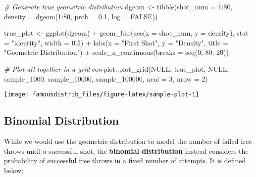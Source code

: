 \documentclass[
]{article}
\newenvironment{Shaded}{\begin{snugshade}}{\end{snugshade}}
\newcommand{\AttributeTok}[1]{\textcolor[rgb]{0.77,0.63,0.00}{#1}}
\newcommand{\CommentTok}[1]{\textcolor[rgb]{0.56,0.35,0.01}{\textit{#1}}}
\newcommand{\ConstantTok}[1]{\textcolor[rgb]{0.00,0.00,0.00}{#1}}
\newcommand{\DecValTok}[1]{\textcolor[rgb]{0.00,0.00,0.81}{#1}}
\newcommand{\FloatTok}[1]{\textcolor[rgb]{0.00,0.00,0.81}{#1}}
\newcommand{\FunctionTok}[1]{\textcolor[rgb]{0.00,0.00,0.00}{#1}}
\newcommand{\NormalTok}[1]{#1}
\newcommand{\OtherTok}[1]{\textcolor[rgb]{0.56,0.35,0.01}{#1}}
\newcommand{\SpecialCharTok}[1]{\textcolor[rgb]{0.00,0.00,0.00}{#1}}
\newcommand{\StringTok}[1]{\textcolor[rgb]{0.31,0.60,0.02}{#1}}
\begin{document}
\begin{Shaded}
\begin{Highlighting}[]
\CommentTok{\# Generate true geometric distribution }
\NormalTok{dgeom }\OtherTok{\textless{}{-}} \FunctionTok{tibble}\NormalTok{(}\AttributeTok{shot\_num =} \DecValTok{1}\SpecialCharTok{:}\DecValTok{80}\NormalTok{,}
                \AttributeTok{density =} \FunctionTok{dgeom}\NormalTok{(}\DecValTok{1}\SpecialCharTok{:}\DecValTok{80}\NormalTok{, }\AttributeTok{prob =} \FloatTok{0.1}\NormalTok{, }\AttributeTok{log =} \ConstantTok{FALSE}\NormalTok{))}

\NormalTok{true\_plot }\OtherTok{\textless{}{-}} \FunctionTok{ggplot}\NormalTok{(dgeom) }\SpecialCharTok{+}
  \FunctionTok{geom\_bar}\NormalTok{(}\FunctionTok{aes}\NormalTok{(}\AttributeTok{x =}\NormalTok{ shot\_num, }\AttributeTok{y =}\NormalTok{ density), }\AttributeTok{stat =} \StringTok{"identity"}\NormalTok{, }\AttributeTok{width =} \FloatTok{0.5}\NormalTok{) }\SpecialCharTok{+}
  \FunctionTok{labs}\NormalTok{(}\AttributeTok{x =} \StringTok{"First Shot"}\NormalTok{, }
       \AttributeTok{y =} \StringTok{"Density"}\NormalTok{, }
       \AttributeTok{title =} \StringTok{"Geometric Distribution"}\NormalTok{) }\SpecialCharTok{+}
  \FunctionTok{scale\_x\_continuous}\NormalTok{(}\AttributeTok{breaks =} \FunctionTok{seq}\NormalTok{(}\DecValTok{0}\NormalTok{, }\DecValTok{80}\NormalTok{, }\DecValTok{20}\NormalTok{))}

\CommentTok{\# Plot all together in a grid}
\NormalTok{cowplot}\SpecialCharTok{::}\FunctionTok{plot\_grid}\NormalTok{(}\ConstantTok{NULL}\NormalTok{, true\_plot, }\ConstantTok{NULL}\NormalTok{, sample\_1000, sample\_10000, sample\_100000, }\AttributeTok{ncol =} \DecValTok{3}\NormalTok{, }\AttributeTok{nrow =} \DecValTok{2}\NormalTok{)}
\end{Highlighting}
\end{Shaded}

\begin{center}\texttt{[image: famousdistrib\_files/figure-latex/sample-plot-1]} \end{center}

\hypertarget{Binomial}{%
\subsection{Binomial Distribution}\label{Binomial}}

While we would use the geometric distribution to model the number of failed free throws until a successful shot, the \textbf{binomial distribution} instead considers the probability of successful free throws in a fixed number of attempts. It is defined below:
\end{document}

